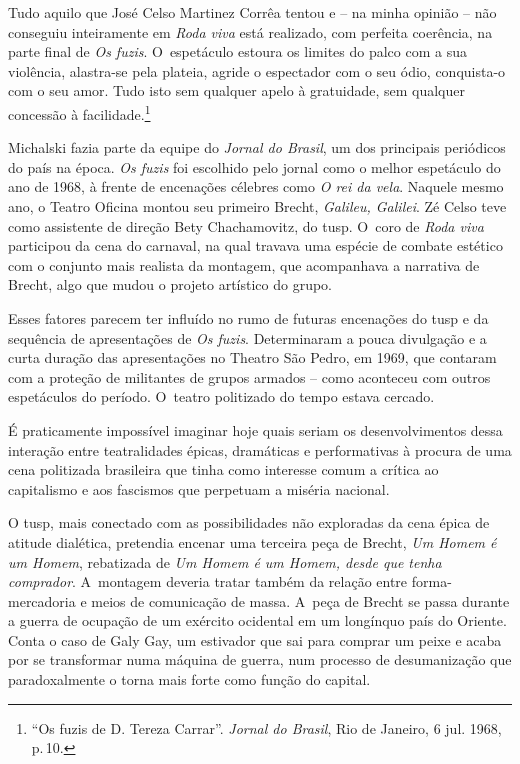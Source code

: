 {\startblockquote
Tudo aquilo que José Celso Martinez Corrêa tentou e -- na minha opinião
-- não conseguiu inteiramente em {\it Roda viva} está realizado, com
perfeita coerência, na parte final de {\it Os fuzis}. O~espetáculo
estoura os limites do palco com a sua violência, alastra-se pela
plateia, agride o espectador com o seu ódio, conquista-o com o seu amor.
Tudo isto sem qualquer apelo à gratuidade, sem qualquer concessão à
facilidade.\footnote{“Os fuzis de D. Tereza Carrar”. {\it Jornal do
  Brasil}, Rio de Janeiro, 6 jul. 1968, p.\,10.}
\stopblockquote


Michalski fazia parte da equipe do {\it Jornal do Brasil}, um dos
principais periódicos do país na época. {\it Os fuzis} foi escolhido
pelo jornal como o melhor espetáculo do ano de 1968, à frente de
encenações célebres como {\it O rei da vela}. Naquele mesmo ano, o
Teatro Oficina montou seu primeiro Brecht, {\it Galileu, Galilei}. Zé
Celso teve como assistente de direção Bety Chachamovitz, do {\sc tusp}. O~coro
de {\it Roda viva} participou da cena do carnaval, na qual travava uma
espécie de combate estético com o conjunto mais realista da montagem,
que acompanhava a narrativa de Brecht, algo que mudou o projeto
artístico do grupo.

Esses fatores parecem ter influído no rumo de futuras encenações do {\sc tusp}
e da sequência de apresentações de {\it Os fuzis}. Determinaram a pouca
divulgação e a curta duração das apresentações no Theatro São Pedro, em
1969, que contaram com a proteção de militantes de grupos armados -- como
aconteceu com outros espetáculos do período. O~teatro politizado do
tempo estava cercado.

É praticamente impossível imaginar hoje quais seriam os desenvolvimentos
dessa interação entre teatralidades épicas, dramáticas e performativas à
procura de uma cena politizada brasileira que tinha como interesse comum
a crítica ao capitalismo e aos fascismos que perpetuam a miséria
nacional.

O {\sc tusp}, mais conectado com as possibilidades não exploradas da cena
épica de atitude dialética, pretendia encenar uma terceira peça de
Brecht, {\it Um Homem é um Homem}, rebatizada de {\it Um Homem é um
Homem, desde que tenha comprador}. A~montagem deveria tratar também da
relação entre forma-mercadoria e meios de comunicação de massa. A~peça
de Brecht se passa durante a guerra de ocupação de um exército ocidental
em um longínquo país do Oriente. Conta o caso de Galy Gay, um estivador
que sai para comprar um peixe e acaba por se transformar numa máquina de
guerra, num processo de desumanização que paradoxalmente o torna mais
forte como função do capital.

}
